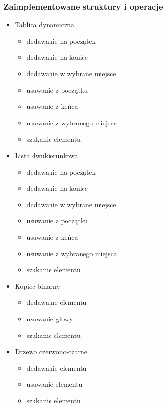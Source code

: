 \documentclass{article}
\begin{document}
        \subsubsection{Zaimplementowane struktury i operacje}
        \begin{itemize}
            \item Tablica dynamiczna
            \begin{itemize}
                \item dodawanie na początek
                \item dodawanie na koniec
                \item dodawanie w wybrane miejsce
                \item usuwanie z początku
                \item usuwanie z końca
                \item usuwanie z wybranego miejsca
                \item szukanie elementu
            \end{itemize}
            \item Lista dwukierunkowa
            \begin{itemize}
                \item dodawanie na początek
                \item dodawanie na koniec
                \item dodawanie w wybrane miejsce
                \item usuwanie z początku
                \item usuwanie z końca
                \item usuwanie z wybranego miejsca
                \item szukanie elementu
            \end{itemize}
            \item Kopiec binarny
            \begin{itemize}
                \item dodawanie elementu
                \item usuwanie głowy
                \item szukanie elementu
            \end{itemize}
            \item Drzewo czerwono-czarne
            \begin{itemize}
                \item dodawanie elementu
                \item usuwanie elementu
                \item szukanie elementu
            \end{itemize}
        \end{itemize}
\end{document}
